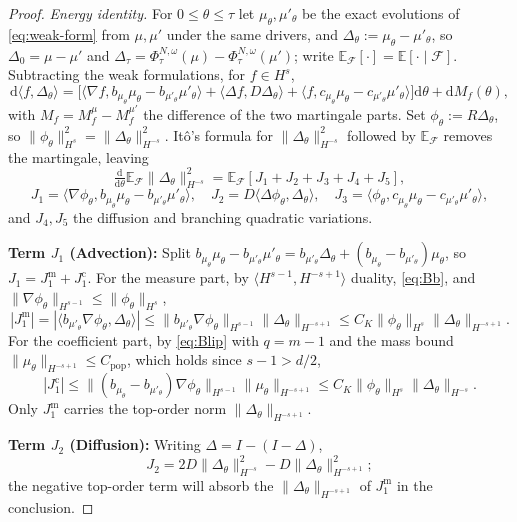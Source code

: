 \documentclass[a4paper,fleqn]{cas-sc}
\theoremstyle{definition}
\theoremstyle{remark}
\begin{document}
\begin{proof}
\emph{Energy identity.} For $0\le\theta\le\tau$ let $\mu_\theta,\mu'_\theta$
be the exact evolutions of \eqref{eq:weak-form} from $\mu,\mu'$ under the same
drivers, and $\Delta_\theta:=\mu_\theta-\mu'_\theta$, so $\Delta_0=\mu-\mu'$ and
$\Delta_\tau=\Phi^{N,\omega}_\tau(\mu)-\Phi^{N,\omega}_\tau(\mu')$; write
$\mathbb E_{\mathcal F}[\cdot]=\mathbb E[\cdot\mid\mathcal F]$. Subtracting the weak
formulations, for $f\in H^s$,
\[
\mathrm d\langle f,\Delta_\theta\rangle
=\bigl[\langle\nabla f,b_{\mu_\theta}\mu_\theta-b_{\mu'_\theta}\mu'_\theta\rangle
+\langle\Delta f,D\Delta_\theta\rangle
+\langle f,c_{\mu_\theta}\mu_\theta-c_{\mu'_\theta}\mu'_\theta\rangle\bigr]\mathrm d\theta
+\mathrm dM_f(\theta),
\]
with $M_f=M^\mu_f-M^{\mu'}_f$ the difference of the two martingale parts. Set
$\phi_\theta:=R\Delta_\theta$, so $\|\phi_\theta\|_{H^s}^2=\|\Delta_\theta\|_{H^{-s}}^2$.
It\^o's formula for $\|\Delta_\theta\|_{H^{-s}}^2$ followed by $\mathbb E_{\mathcal F}$
removes the martingale, leaving
\[
\tfrac{\mathrm d}{\mathrm d\theta}\mathbb E_{\mathcal F}\|\Delta_\theta\|_{H^{-s}}^2
=\mathbb E_{\mathcal F}[J_1+J_2+J_3+J_4+J_5],
\]
\[
J_1=\langle\nabla\phi_\theta,b_{\mu_\theta}\mu_\theta-b_{\mu'_\theta}\mu'_\theta\rangle,
\quad J_2=D\langle\Delta\phi_\theta,\Delta_\theta\rangle,
\quad J_3=\langle\phi_\theta,c_{\mu_\theta}\mu_\theta-c_{\mu'_\theta}\mu'_\theta\rangle,
\]
and $J_4,J_5$ the diffusion and branching quadratic variations.

\textbf{Term $J_1$ (Advection):} Split
$b_{\mu_\theta}\mu_\theta-b_{\mu'_\theta}\mu'_\theta
=b_{\mu'_\theta}\Delta_\theta+(b_{\mu_\theta}-b_{\mu'_\theta})\mu_\theta$, so
$J_1=J_1^{\mathrm m}+J_1^{\mathrm c}$. For the measure part, by
$\langle H^{s-1},H^{-s+1}\rangle$ duality, \eqref{eq:Bb}, and
$\|\nabla\phi_\theta\|_{H^{s-1}}\le\|\phi_\theta\|_{H^s}$,
\[
|J_1^{\mathrm m}|=|\langle b_{\mu'_\theta}\nabla\phi_\theta,\Delta_\theta\rangle|
\le\|b_{\mu'_\theta}\nabla\phi_\theta\|_{H^{s-1}}\|\Delta_\theta\|_{H^{-s+1}}
\le C_K\|\phi_\theta\|_{H^s}\|\Delta_\theta\|_{H^{-s+1}} .
\]
For the coefficient part, by \eqref{eq:Blip} with $q=m-1$ and the mass bound
$\|\mu_\theta\|_{H^{-s+1}}\le C_{\mathrm{pop}}$, which holds since $s-1>d/2$,
\[
|J_1^{\mathrm c}|
\le\|(b_{\mu_\theta}-b_{\mu'_\theta})\nabla\phi_\theta\|_{H^{s-1}}\|\mu_\theta\|_{H^{-s+1}}
\le C_K\|\phi_\theta\|_{H^s}\|\Delta_\theta\|_{H^{-s}} .
\]
Only $J_1^{\mathrm m}$ carries the top-order norm $\|\Delta_\theta\|_{H^{-s+1}}$.

\textbf{Term $J_2$ (Diffusion):} Writing $\Delta=I-(I-\Delta)$,
\[
J_2=2D\|\Delta_\theta\|_{H^{-s}}^2-D\|\Delta_\theta\|_{H^{-s+1}}^2 ;
\]
the negative top-order term will absorb the $\|\Delta_\theta\|_{H^{-s+1}}$ of
$J_1^{\mathrm m}$ in the conclusion.


\end{proof}
\end{document}
